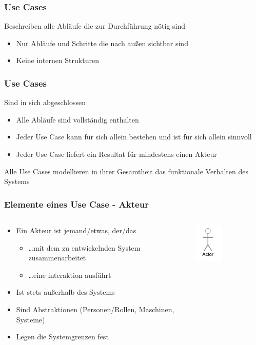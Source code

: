 \begin{frame}
\frametitle{Use Cases}
	Beschreiben alle Abläufe die zur Durchführung nötig sind
	\begin{itemize}
		\item Nur Abläufe und Schritte die nach außen sichtbar sind
		\item Keine internen Strukturen
	\end{itemize}
\end{frame}

\begin{frame}
\frametitle{Use Cases}
	Sind in sich abgeschlossen
	\begin{itemize}
		\item Alle Abläufe sind vollständig enthalten
		\item Jeder Use Case kann für sich allein bestehen und ist für sich allein sinnvoll
		\item Jeder Use Case liefert ein Resultat für mindestens einen Akteur
	\end{itemize}
	\bigskip
	Alle Use Cases modellieren in ihrer Gesamtheit das funktionale Verhalten des Systems
\end{frame}

\begin{frame}
\frametitle{Elemente eines Use Case - Akteur}
	\begin{columns}
		\begin{column}{.6\textwidth}
				\begin{itemize}
					\item Ein Akteur ist jemand/etwas, der/das
					\begin{itemize}
						\item \ldots mit dem zu entwickelnden System zusammenarbeitet
						\item \ldots eine interaktion ausführt
					\end{itemize}
					\item Ist stets außerhalb des Systems
					\item Sind Abstraktionen (Personen/Rollen, Maschinen, Systeme)
					\item Legen die Systemgrenzen fest
				\end{itemize}
		\end{column}
		\begin{column}{.4\textwidth}
			\center
			\includegraphics[width=0.4\textwidth,
			keepaspectratio=true]{bilder/akteur.png}
		\end{column}
	\end{columns}
\end{frame}

